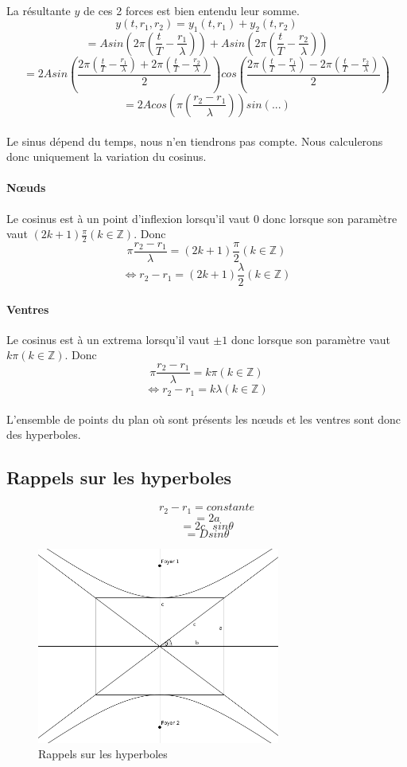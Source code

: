 \documentclass[a4paper]{article}
\begin{document}
\paragraph{}La résultante $y$ de ces 2 forces est bien entendu leur somme.
\[y(t,r_1,r_2)=y_1(t,r_1)+y_2(t,r_2)\]
\[=Asin\left(2\pi\left(\frac{t}{T}-\frac{r_1}{\lambda}\right)\right)+Asin\left(2\pi\left(\frac{t}{T}-\frac{r_2}{\lambda}\right)\right)\]
\[=2Asin\left(\frac{2\pi\left(\frac{t}{T}-\frac{r_1}{\lambda}\right)+2\pi\left(\frac{t}{T}-\frac{r_2}{\lambda}\right)}{2}\right)cos\left(\frac{2\pi\left(\frac{t}{T}-\frac{r_1}{\lambda}\right)-2\pi\left(\frac{t}{T}-\frac{r_2}{\lambda}\right)}{2}\right)\]
\[=2Acos\left(\pi\left(\frac{r_2-r_1}{\lambda}\right)\right)sin\left(...\right)\]
\paragraph{}Le sinus dépend du temps, nous n'en tiendrons pas compte. Nous calculerons donc uniquement la variation du cosinus.
\paragraph{Nœuds}Le cosinus est à un point d'inflexion lorsqu'il vaut $0$ donc lorsque son paramètre vaut $(2k+1)\frac{\pi}{2} (k \in \mathbb{Z})$. Donc
\[\pi\frac{r_2-r_1}{\lambda}=(2k+1)\frac{\pi}{2} (k \in \mathbb{Z})\]
\[\Leftrightarrow r_2-r_1=(2k+1)\frac{\lambda}{2} (k \in \mathbb{Z})\]
\paragraph{Ventres}Le cosinus est à un extrema lorsqu'il vaut $\pm1$ donc lorsque son paramètre vaut $k\pi (k \in \mathbb{Z})$. Donc
\[\pi\frac{r_2-r_1}{\lambda}=k\pi (k \in \mathbb{Z})\]
\[\Leftrightarrow r_2-r_1=k\lambda (k \in \mathbb{Z})\]
\paragraph{}L'ensemble de points du plan où sont présents les nœuds et les ventres sont donc des hyperboles.
\subsection{Rappels sur les hyperboles}
\[r_2-r_1=constante\]
\[=2a\]
\[=2c\text{ }sin\theta\]
\[=Dsin\theta\]
\begin{figure}
\begin{center}
\includegraphics[width=8cm]{imgs/hyperbole.png}
\end{center}
\caption{Rappels sur les hyperboles}
\label{Rappels sur les hyperboles}
\end{figure}
\end{document}
